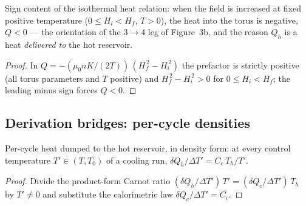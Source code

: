 \begin{lemma}
\label{lem:IPhO2026Problems_problem_IPhO_2026_3_C_4:heat_leaves_torus_on_field_increase}
Sign content of the isothermal heat relation: when the field is
increased at fixed positive temperature ($0 \le H_i < H_f$, $T > 0$),
the heat into the torus is negative, $Q < 0$ --- the orientation of
the $3 \to 4$ leg of Figure~3b, and the reason $Q_h$ is a heat
\emph{delivered to} the hot reservoir.
\end{lemma}
\begin{proof}
In $Q = -(\mu_0 n K/(2T))\,(H_f^{\,2} - H_i^{\,2})$ the prefactor is
strictly positive (all torus parameters and $T$ positive) and
$H_f^{\,2} - H_i^{\,2} > 0$ for $0 \le H_i < H_f$; the leading minus
sign forces $Q < 0$.
\end{proof}

\subsection*{Derivation bridges: per-cycle densities}

\begin{lemma}
\label{lem:IPhO2026Problems_problem_IPhO_2026_3_C_4:heatDumpedDensity_eq}
Per-cycle heat dumped to the hot reservoir, in density form: at every
control temperature $T' \in (T, T_0)$ of a cooling run,
$\delta Q_h/\Delta T' = C_c\,T_h/T'$.
\end{lemma}
\begin{proof}
Divide the product-form Carnot ratio
$(\delta Q_h/\Delta T')\,T' = (\delta Q_c/\Delta T')\,T_h$ by
$T' \neq 0$ and substitute the calorimetric law
$\delta Q_c/\Delta T' = C_c$.
\end{proof}

